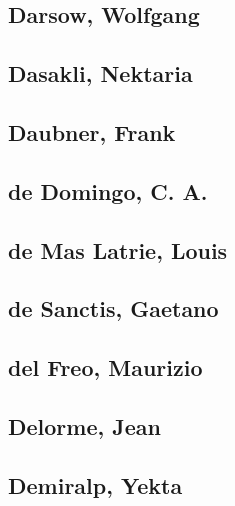 \subsection[Darsow, Wolfgang (1)]{Darsow, Wolfgang}

\subsection[Dasakli, Nektaria (1)]{Dasakli, Nektaria}

\subsection[Daubner, Frank (1)]{Daubner, Frank}

\subsection[de Domingo, C. A. (1)]{de Domingo, C. A.}

\subsection[de Mas Latrie, Louis (1)]{de Mas Latrie, Louis}

\subsection[de Sanctis, Gaetano (2)]{de Sanctis, Gaetano}


\subsection[del Freo, Maurizio (1)]{del Freo, Maurizio}

\subsection[Delorme, Jean (1)]{Delorme, Jean}

\subsection[Demiralp, Yekta (2)]{Demiralp, Yekta}

